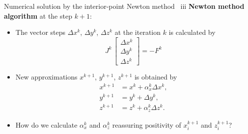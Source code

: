 \begin{frame}{Numerical solution by the interior-point Newton method \, iii}
%
\vskip 10pt
\alert{\bf Newton method algorithm} at the step $k+1$: 
%	
\begin{itemize}
\item The vector steps $\Delta x^{k}$, $\Delta y^{k}$,
$\Delta z^{k}$ at the iteration $k$ is calculated by 
%
\[
J^k \, 
\begin{bmatrix}
	\Delta x^{k}\\
	\Delta y^{k}\\
	\Delta z^{k}
\end{bmatrix}
=- F^k
\]
%
\item New approximations $x^{k+1}$, $y^{k+1}$,
$z^{k+1}$ is obtained by
\begin{align*}
x^{k+1} & =x^{k}+\alpha_{x}^{k}\Delta x^{k},\\
y^{k+1} & =y^{k}+\Delta y^{k},\\
z^{k+1} & =z^{k}+\alpha_{z}^{k}\Delta z^{k}.
\end{align*}
\item How do we calculate $\alpha_{x}^{k}$ and $\alpha_{z}^{k}$ 
reassuring positivity of $x_{i}^{k+1}$ and $z_{i}^{k+1}$?
\end{itemize}
\end{frame}
%
%
